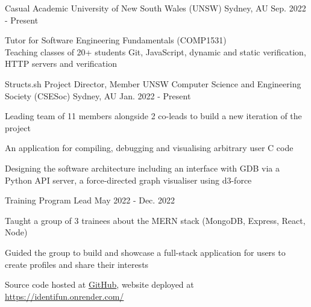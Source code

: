 

\begin{cventries}

  \cventry
    {Casual Academic} %
    {University of New South Wales (UNSW)} %
    {Sydney, AU} %
    {Sep. 2022 - Present} %
    {
      \begin{cvitems} %
        \item {Tutor for Software Engineering Fundamentals (COMP1531) \\
        Teaching classes of 20+ students Git, JavaScript, dynamic and static verification, HTTP servers and verification} 
      \end{cvitems}
    }

  \cventry
    {Structs.sh Project Director, Member} %
    {UNSW Computer Science and Engineering Society (CSESoc)} %
    {Sydney, AU} %
    {Jan. 2022 - Present} %
    {
      \begin{cvitems} %
        \item {Leading team of 11 members alongside 2 co-leads to build a new iteration of the project}
        \item {An application for compiling, debugging and visualising arbitrary user C code}
        \item {Designing the software architecture including an interface with GDB via a Python API server, a force-directed graph visualiser using d3-force}
      \end{cvitems}
    }

  \cventry
    {Training Program Lead} %
    {}
    {} %
    {May 2022 - Dec. 2022} %
    {
      \begin{cvitems} %
        \item {Taught a group of 3 trainees about the MERN stack (MongoDB, Express, React, Node)}
        \item {Guided the group to build and showcase a full-stack application for users to create profiles and share their interests}
        \item {Source code hosted at \href{https://github.com/csesoc/trainee-4-22t3}{\faGithub GitHub}, website deployed at \url{https://identifun.onrender.com/}}
      \end{cvitems}
    }

\end{cventries}
